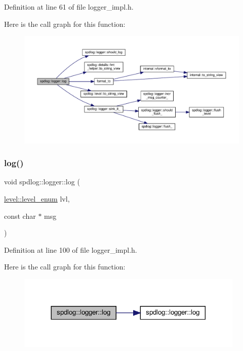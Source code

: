 Definition at line 61 of file logger\+\_\+impl.\+h.

Here is the call graph for this function\+:
\nopagebreak
\begin{figure}[H]
\begin{center}
\leavevmode
\includegraphics[width=350pt]{classspdlog_1_1logger_a50417cea5f81704cd4800aaafa944bc5_cgraph}
\end{center}
\end{figure}
\mbox{\label{classspdlog_1_1logger_ae59d1c2d5b3a4cc4807534c73b46f297}} 
\subsubsection{\texorpdfstring{log()}{log()}\hspace{0.1cm}{\footnotesize\ttfamily [3/8]}}
{\footnotesize\ttfamily void spdlog\+::logger\+::log (\begin{DoxyParamCaption}\item[{\hyperlink{namespacespdlog_1_1level_a35f5227e5daf228d28a207b7b2aefc8b}{level\+::level\+\_\+enum}}]{lvl,  }\item[{const char $\ast$}]{msg }\end{DoxyParamCaption})\hspace{0.3cm}{\ttfamily [inline]}}



Definition at line 100 of file logger\+\_\+impl.\+h.

Here is the call graph for this function\+:
\nopagebreak
\begin{figure}[H]
\begin{center}
\leavevmode
\includegraphics[width=308pt]{classspdlog_1_1logger_ae59d1c2d5b3a4cc4807534c73b46f297_cgraph}
\end{center}
\end{figure}
\mbox{\label{classspdlog_1_1logger_abf7d5c94e0c295aa2e55e1139b787a57}} 
